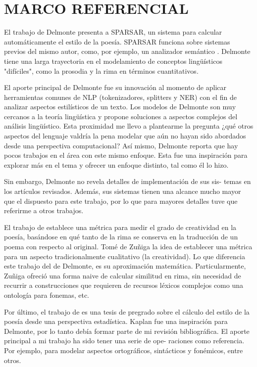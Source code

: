 \documentclass[twoside]{article}
\begin{document}
\section{MARCO REFERENCIAL}
\label{sec:org533210e}

El trabajo de Delmonte \cite{delmonte2013computing} presenta a
SPARSAR, un sistema para calcular automáticamente el estilo de la
poesía. SPARSAR funciona sobre sistemas previos del mismo autor, como,
por ejemplo, un analizador semántico \cite{delmonte2005venses}.
Delmonte tiene una larga trayectoria en el modelamiento de conceptos
lingüísticos "difíciles", como la prosodia y la rima en términos
cuantitativos.

El aporte principal de Delmonte fue su innovación al momento de aplicar
herramientas comunes de NLP (tokenizadores, splitters y NER) con el fin
de analizar aspectos estilísticos de un texto. Los modelos de Delmonte
son muy cercanos a la teoría lingüística y propone soluciones a aspectos
complejos del análisis lingüístico. Esta proximidad me llevo a
plantearme la pregunta ¿qué otros aspectos del lenguaje valdría la pena
modelar que aún no hayan sido abordados desde una perspectiva
computacional? Así mismo, Delmonte reporta que hay pocos trabajos en el
área con este mismo enfoque. Esta fue una inspiración para explorar más
en el tema y ofrecer un enfoque distinto, tal como él lo hizo.

Sin embargo, Delmonte no revela detalles de implementación de sus sis-
temas en los artículos revisados. Además, sus sistemas tienen una
alcance mucho mayor que el dispuesto para este trabajo, por lo que para
mayores detalles tuve que referirme a otros trabajos.

El trabajo de \cite{zuniga2017automatic} establece una métrica para
medir el grado de creatividad en la poesía, basándose en qué tanto de
la rima se conserva en la traducción de un poema con respecto al
original. Tomé de Zuñiga la idea de establecer una métrica para un
aspecto tradicionalmente cualitativo (la creatividad). Lo que
diferencia este trabajo del de Delmonte, es su aproximación
matemática. Particularmente, Zuñiga ofreció una forma naive de
calcular similitud en rima, sin necesidad de recurrir a construcciones
que requieren de recursos léxicos complejos como una ontología para
fonemas, etc.

Por último, el trabajo de \cite{kaplan2006computational} es una tesis
de pregrado sobre el cálculo del estilo de la poesía desde una
perspectiva estadística. Kaplan fue una inspiración para Delmonte, por
lo tanto debía formar parte de mi revisión bibliográfica. El aporte
principal a mi trabajo ha sido tener una serie de ope- raciones como
referencia. Por ejemplo, para modelar aspectos ortográficos,
sintácticos y fonémicos, entre otros.
\end{document}
